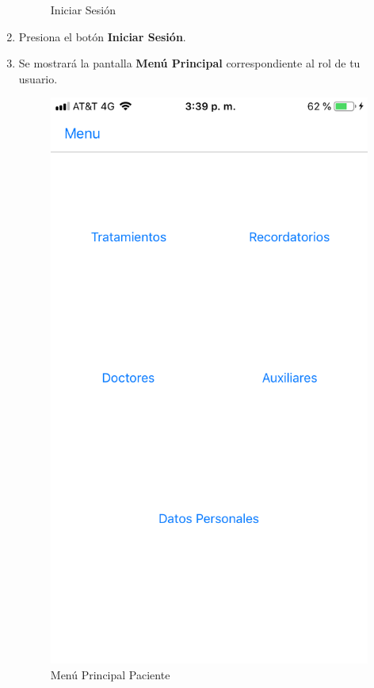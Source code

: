 \begin{enumerate}
\begin{figure}[!htbp]
\begin{center}
			\caption{Iniciar Sesión}
			\label{fig:IniciarSesion2}
		\end{center}
	\end{figure}

	\item Presiona el botón \textbf{Iniciar Sesión}.
	
	\item Se mostrará la pantalla \textbf{Menú Principal} correspondiente al rol de tu usuario.
	\newpage
		\begin{figure}[!htbp]			\hypertarget{fig:mpPaciente}{\hspace{1pt}}
		\begin{center}
			\includegraphics[height=0.4\textheight]{Paciente/IniciarSesion/images/mpPaciente}
			\caption{Menú Principal Paciente}
			\label{fig:mpPaciente}
		\end{center}
	\end{figure}


\end{enumerate}

